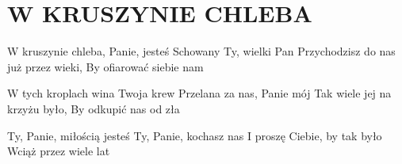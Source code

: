 \documentclass[../../../songbook.tex]{subfiles}
\begin{document}
\TabPositions{8cm} %
\section*{W KRUSZYNIE CHLEBA}
{}
\vspace{0.5cm}
W kruszynie chleba, Panie, jesteś		 \newline
Schowany Ty, wielki Pan					 \newline
Przychodzisz do nas już przez wieki,	 \newline
By ofiarować siebie nam					 \newline

W tych kroplach wina Twoja krew \newline
Przelana za nas, Panie mój \newline
Tak wiele jej na krzyżu było, \newline
By odkupić nas od zła \newline

Ty, Panie, miłością jesteś \newline
Ty, Panie, kochasz nas \newline
I proszę Ciebie, by tak było \newline
Wciąż przez wiele lat \newline
\end{document}
